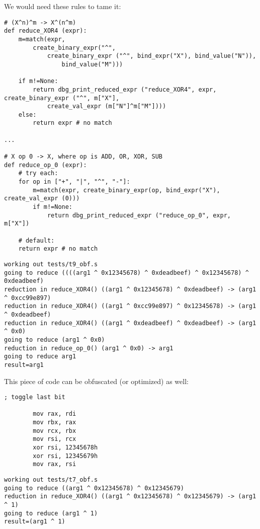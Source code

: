 ﻿\documentclass[12pt]{article}
\begin{document}
We would need these rules to tame it:

\begin{lstlisting}
# (X^n)^m -> X^(n^m)
def reduce_XOR4 (expr):
    m=match(expr, 
        create_binary_expr("^",
            create_binary_expr ("^", bind_expr("X"), bind_value("N")),
                bind_value("M")))
    
    if m!=None:
        return dbg_print_reduced_expr ("reduce_XOR4", expr, create_binary_expr ("^", m["X"], 
            create_val_expr (m["N"]^m["M"])))
    else:
        return expr # no match

...

# X op 0 -> X, where op is ADD, OR, XOR, SUB
def reduce_op_0 (expr):
    # try each:
    for op in ["+", "|", "^", "-"]:
        m=match(expr, create_binary_expr(op, bind_expr("X"), create_val_expr (0)))
        if m!=None:
            return dbg_print_reduced_expr ("reduce_op_0", expr, m["X"])

    # default:
    return expr # no match
\end{lstlisting}

\begin{lstlisting}
working out tests/t9_obf.s
going to reduce ((((arg1 ^ 0x12345678) ^ 0xdeadbeef) ^ 0x12345678) ^ 0xdeadbeef)
reduction in reduce_XOR4() ((arg1 ^ 0x12345678) ^ 0xdeadbeef) -> (arg1 ^ 0xcc99e897)
reduction in reduce_XOR4() ((arg1 ^ 0xcc99e897) ^ 0x12345678) -> (arg1 ^ 0xdeadbeef)
reduction in reduce_XOR4() ((arg1 ^ 0xdeadbeef) ^ 0xdeadbeef) -> (arg1 ^ 0x0)
going to reduce (arg1 ^ 0x0)
reduction in reduce_op_0() (arg1 ^ 0x0) -> arg1
going to reduce arg1
result=arg1
\end{lstlisting}

This piece of code can be obfuscated (or optimized) as well:

\begin{lstlisting}
; toggle last bit

        mov rax, rdi
        mov rbx, rax
        mov rcx, rbx
        mov rsi, rcx
        xor rsi, 12345678h
        xor rsi, 12345679h
        mov rax, rsi
\end{lstlisting}

\begin{lstlisting}
working out tests/t7_obf.s
going to reduce ((arg1 ^ 0x12345678) ^ 0x12345679)
reduction in reduce_XOR4() ((arg1 ^ 0x12345678) ^ 0x12345679) -> (arg1 ^ 1)
going to reduce (arg1 ^ 1)
result=(arg1 ^ 1)
\end{lstlisting}
\end{document}
